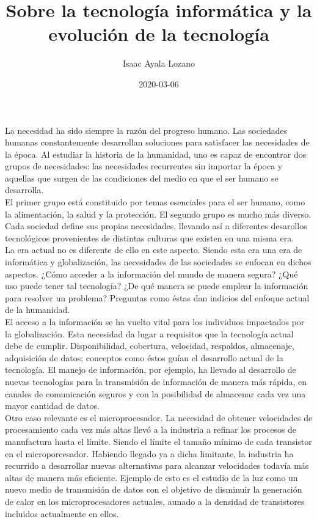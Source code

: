 \documentclass[a4paper,12pt]{article}
\title{Sobre la tecnología informática y la evolución de la tecnología}
\author{Isaac Ayala Lozano}
\date{2020-03-06}
\begin{document}
\maketitle

La necesidad ha sido siempre la razón del progreso humano.
Las sociedades humanas constantemente desarrollan soluciones para satisfacer las necesidades de la época.
Al estudiar la historia de la humanidad, uno es capaz de
encontrar dos grupos de necesidades: las necesidades recurrentes sin importar la época y aquellas que surgen de las condiciones del medio en que el ser humano se desarrolla.\\

El primer grupo está constituido por temas esenciales para el ser humano, como la alimentación, la salud y la protección.
El segundo grupo es mucho más diverso.
Cada sociedad define sus propias necesidades, llevando así a diferentes desarollos tecnológicos provenientes de distintas culturas que existen en una misma era.\\

La era actual no es diferente de ello en este aspecto.
Siendo esta era una era de informática y globalización,
las necesidades de las sociedades se enfocan en dichos aspectos.
¿Cómo acceder a la información del mundo de manera segura?
¿Qué uso puede tener tal tecnología?
¿De qué manera se puede emplear la información para resolver un problema?
Preguntas como éstas dan indicios del enfoque actual de la humanidad.\\

El acceso a la información se ha vuelto vital para los individuos impactados por la globalización.
Esta necesidad da lugar a requisitos que la tecnología actual debe de cumplir.
Disponibilidad, cobertura, velocidad, respaldos, almacenaje, adquisición de datos; conceptos como éstos guían el desarrollo actual de la tecnología.
El manejo de información, por ejemplo, ha llevado al desarrollo de nuevas tecnologías para la transmisión de información de manera más rápida, en canales de comunicación seguros y con la posibilidad de almacenar cada vez una mayor cantidad de datos.\\

Otro caso relevante es el microprocesador.
La necesidad de obtener velocidades de procesamiento cada vez más altas llevó a la industria a refinar los procesos de manufactura hasta el límite.
Siendo el límite el tamaño mínimo de cada transistor en el microporcesador.
Habiendo llegado ya a dicha limitante, la industria ha recurrido a desarrollar nuevas alternativas para alcanzar velocidades todavía más altas de manera más eficiente.
Ejemplo de esto es el estudio de la luz como un nuevo medio de transmisión de datos con el objetivo de disminuir la generación de calor en los microprocesadores actuales, aunado a la densidad de transistores incluidos actualmente en ellos.\\
\end{document}
